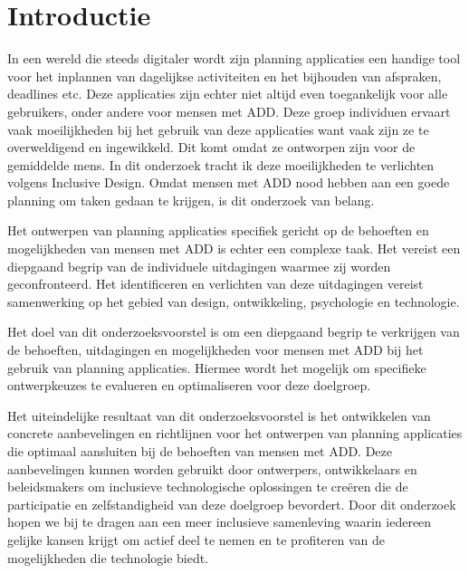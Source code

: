 
\section{Introductie}%
\label{sec:introductie}
In een wereld die steeds digitaler wordt zijn planning applicaties een handige tool voor het inplannen van dagelijkse activiteiten en het bijhouden van afspraken, deadlines etc. Deze applicaties zijn echter niet altijd even toegankelijk voor alle gebruikers, onder andere voor mensen met ADD. Deze groep individuen ervaart vaak moeilijkheden bij het gebruik van deze applicaties want vaak zijn ze te overweldigend en ingewikkeld. Dit komt omdat ze ontworpen zijn voor de gemiddelde mens. In dit onderzoek tracht ik deze moeilijkheden te verlichten volgens Inclusive Design. Omdat mensen met ADD nood hebben aan een goede planning om taken gedaan te krijgen, is dit onderzoek van belang. \newline 

Het ontwerpen van planning applicaties specifiek gericht op de behoeften en mogelijkheden van mensen met ADD is echter een complexe taak. Het vereist een diepgaand begrip van de individuele uitdagingen waarmee zij worden geconfronteerd. Het identificeren en verlichten van deze uitdagingen vereist samenwerking op het gebied van design, ontwikkeling, psychologie en technologie. \newline 

Het doel van dit onderzoeksvoorstel is om een diepgaand begrip te verkrijgen van de behoeften, uitdagingen en mogelijkheden voor mensen met ADD bij het gebruik van planning applicaties. Hiermee wordt het mogelijk om specifieke ontwerpkeuzes te evalueren en optimaliseren voor deze doelgroep. \newline 

Het uiteindelijke resultaat van dit onderzoeksvoorstel is het ontwikkelen van concrete aanbevelingen en richtlijnen voor het ontwerpen van planning applicaties die optimaal aansluiten bij de behoeften van mensen met ADD. Deze aanbevelingen kunnen worden gebruikt door ontwerpers, ontwikkelaars en beleidsmakers om inclusieve technologische oplossingen te creëren die de participatie en zelfstandigheid van deze doelgroep bevordert.
Door dit onderzoek hopen we bij te dragen aan een meer inclusieve samenleving waarin iedereen gelijke kansen krijgt om actief deel te nemen en te profiteren van de mogelijkheden die technologie biedt.


